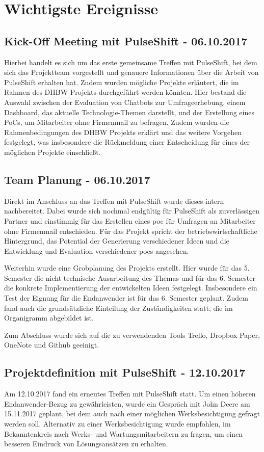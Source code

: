\chapter{Wichtigste Ereignisse}
\label{chap:events}
\section{Kick-Off Meeting mit PulseShift - 06.10.2017}
Hierbei handelt es sich um das erste gemeinsame Treffen mit PulseShift, bei dem sich das Projektteam vorgestellt und genauere Informationen über die Arbeit von PulseShift erhalten hat. Zudem wurden mögliche Projekte erläutert, die im Rahmen des DHBW Projekts durchgeführt werden könnten. Hier bestand die Auswahl zwischen der Evaluation von Chatbots zur Umfrageerhebung, einem Dashboard, das aktuelle Technologie-Themen darstellt, und der Erstellung eines PoCs, um Mitarbeiter ohne Firmenmail zu befragen. Zudem wurden die Rahmenbedingungen des DHBW Projekts erklärt und das weitere Vorgehen festgelegt, was insbesondere die Rückmeldung einer Entscheidung für eines der möglichen Projekte einschließt.

\section{Team Planung - 06.10.2017}
Direkt im Anschluss an das Treffen mit PulseShift wurde dieses intern nachbereitet. Dabei wurde sich nochmal endgültig für PulseShift als zuverlässigen Partner und einstimmig für das Erstellen eines \gls{poc} für Umfragen an Mitarbeiter ohne Firmenmail entschieden. Für das Projekt spricht der betriebswirtschaftliche Hintergrund, das Potential der Generierung verschiedener Ideen und die Entwicklung und Evaluation verschiedener \gls{poc}s angesehen.

Weiterhin wurde eine Grobplanung des Projekts erstellt. Hier wurde für das 5. Semester die nicht-technische Ausarbeitung des Themas und für das 6. Semester die konkrete Implementierung der entwickelten Ideen festgelegt. Insbesondere ein Test der Eignung für die Endanwender ist für das 6. Semester geplant. Zudem fand auch die grundsätzliche Einteilung der Zuständigkeiten statt, die im Organigramm abgebildet ist.

Zum Abschluss wurde sich auf die zu verwendenden Tools Trello, Dropbox Paper, OneNote und Github geeinigt.

\section{Projektdefinition mit PulseShift - 12.10.2017}
Am 12.10.2017 fand ein erneutes Treffen mit PulseShift statt. Um einen höheren Endanwender-Bezug zu gewährleisten, wurde ein Gespräch mit John Deere am 15.11.2017 geplant, bei dem auch nach einer möglichen Werksbesichtigung gefragt werden soll. Alternativ zu einer Werksbesichtigung wurde empfohlen, im Bekanntenkreis nach Werks- und Wartungsmitarbeitern zu fragen, um einen besseren Eindruck von Lösungsansätzen zu erhalten.

